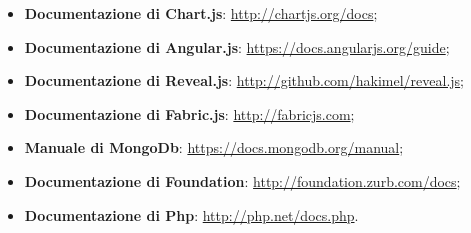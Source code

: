 \begin{itemize}
\begin{itemize}
\begin{itemize}
\begin{itemize}
						\end{itemize}
					\end{itemize}
					\item \textbf{Documentazione di Chart.js}: \url{http://chartjs.org/docs};
					\item \textbf{Documentazione di Angular.js}: \url{https://docs.angularjs.org/guide};
					\item \textbf{Documentazione di Reveal.js}: \url{http://github.com/hakimel/reveal.js};
					\item \textbf{Documentazione di Fabric.js}: \url{http://fabricjs.com};
					\item \textbf{Manuale di MongoDb}: \url{https://docs.mongodb.org/manual};
					\item \textbf{Documentazione di Foundation}: \url{http://foundation.zurb.com/docs};
					\item \textbf{Documentazione di Php}: \url{http://php.net/docs.php}.
				\end{itemize}

	\end{itemize}